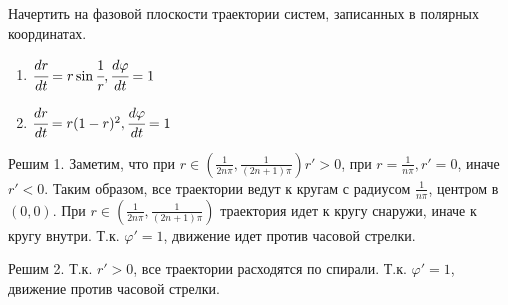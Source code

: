 \begin{figure}[h]
    \centering
    
\end{figure}

\section{}

Начертить на фазовой плоскости траектории систем, записанных в полярных координатах.

\begin{enumerate}
    \item \(\cfrac{dr}{dt} = r \sin \cfrac{1}{r}, \cfrac{d\varphi}{dt} = 1\)
    \item \(\cfrac{dr}{dt} = r(1 - r)^2, \cfrac{d\varphi}{dt} = 1\)
\end{enumerate}

Решим 1. Заметим, что при \(r\in \left( \frac{1}{2n\pi}, \frac{1}{(2n + 1)\pi} \right) r' > 0\), при \(r = \frac{1}{n\pi}, r' = 0\), иначе \(r' < 0\). Таким образом, все траектории ведут к кругам с радиусом \(\frac{1}{n\pi}\), центром в \((0, 0)\). При \(r\in \left( \frac{1}{2n\pi}, \frac{1}{(2n + 1)\pi} \right)\) траектория идет к кругу снаружи, иначе к кругу внутри. Т.к. \(\varphi' = 1\), движение идет против часовой стрелки.

\begin{figure}[h]
    \centering
    
\end{figure}

Решим 2. Т.к. \(r' > 0\), все траектории расходятся по спирали. Т.к. \(\varphi' = 1\), движение против часовой стрелки.

\begin{figure}[h]
    \centering
    
\end{figure}

